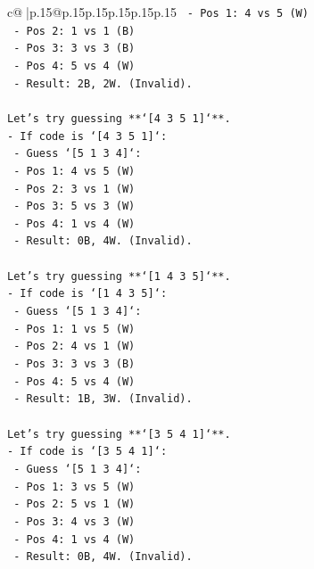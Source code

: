 \documentclass{article}
\begin{document}
{\begin{supertabular}{c@{$\;$}|p{.15\linewidth}@{}p{.15\linewidth}p{.15\linewidth}p{.15\linewidth}p{.15\linewidth}p{.15\linewidth}}
{{{\texttt{        {-} Pos 1: 4 vs 5 (W)} \\
\texttt{        {-} Pos 2: 1 vs 1 (B)} \\
\texttt{        {-} Pos 3: 3 vs 3 (B)} \\
\texttt{        {-} Pos 4: 5 vs 4 (W)} \\
\texttt{        {-} Result: 2B, 2W. (Invalid).} \\
\\ 
\texttt{Let's try guessing **`{[}4 3 5 1{]}`**.} \\
\texttt{{-} If code is `{[}4 3 5 1{]}`:} \\
\texttt{    {-} Guess `{[}5 1 3 4{]}`:} \\
\texttt{        {-} Pos 1: 4 vs 5 (W)} \\
\texttt{        {-} Pos 2: 3 vs 1 (W)} \\
\texttt{        {-} Pos 3: 5 vs 3 (W)} \\
\texttt{        {-} Pos 4: 1 vs 4 (W)} \\
\texttt{        {-} Result: 0B, 4W. (Invalid).} \\
\\ 
\texttt{Let's try guessing **`{[}1 4 3 5{]}`**.} \\
\texttt{{-} If code is `{[}1 4 3 5{]}`:} \\
\texttt{    {-} Guess `{[}5 1 3 4{]}`:} \\
\texttt{        {-} Pos 1: 1 vs 5 (W)} \\
\texttt{        {-} Pos 2: 4 vs 1 (W)} \\
\texttt{        {-} Pos 3: 3 vs 3 (B)} \\
\texttt{        {-} Pos 4: 5 vs 4 (W)} \\
\texttt{        {-} Result: 1B, 3W. (Invalid).} \\
\\ 
\texttt{Let's try guessing **`{[}3 5 4 1{]}`**.} \\
\texttt{{-} If code is `{[}3 5 4 1{]}`:} \\
\texttt{    {-} Guess `{[}5 1 3 4{]}`:} \\
\texttt{        {-} Pos 1: 3 vs 5 (W)} \\
\texttt{        {-} Pos 2: 5 vs 1 (W)} \\
\texttt{        {-} Pos 3: 4 vs 3 (W)} \\
\texttt{        {-} Pos 4: 1 vs 4 (W)} \\
\texttt{        {-} Result: 0B, 4W. (Invalid).} \\
\\ 
}}}
\end{supertabular}}
\end{document}
